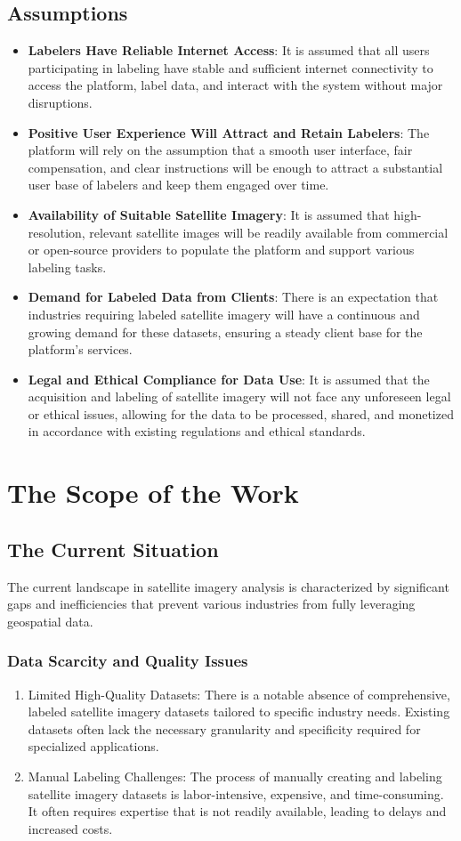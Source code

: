 \documentclass[12pt]{article}
\begin{document}
\subsection{Assumptions}
\begin{itemize}
    \item \textbf{Labelers Have Reliable Internet Access}: It is assumed that all users participating in labeling have stable and sufficient internet connectivity to access the platform, label data, and interact with the system without major disruptions.
    \item \textbf{Positive User Experience Will Attract and Retain Labelers}: The platform will rely on the assumption that a smooth user interface, fair compensation, and clear instructions will be enough to attract a substantial user base of labelers and keep them engaged over time.
    \item \textbf{Availability of Suitable Satellite Imagery}: It is assumed that high-resolution, relevant satellite images will be readily available from commercial or open-source providers to populate the platform and support various labeling tasks.
    \item \textbf{Demand for Labeled Data from Clients}: There is an expectation that industries requiring labeled satellite imagery will have a continuous and growing demand for these datasets, ensuring a steady client base for the platform’s services.
    \item \textbf{Legal and Ethical Compliance for Data Use}: It is assumed that the acquisition and labeling of satellite imagery will not face any unforeseen legal or ethical issues, allowing for the data to be processed, shared, and monetized in accordance with existing regulations and ethical standards.
\end{itemize}

\newpage
\section{The Scope of the Work}
\subsection{The Current Situation}
The current landscape in satellite imagery analysis is characterized by significant gaps and inefficiencies that prevent various industries from fully leveraging geospatial data.
\subsubsection{Data Scarcity and Quality Issues}
\begin{enumerate}
    \item Limited High-Quality Datasets: There is a notable absence of comprehensive, labeled satellite imagery datasets tailored to specific industry needs. Existing datasets often lack the necessary granularity and specificity required for specialized applications.
    \item Manual Labeling Challenges: The process of manually creating and labeling satellite imagery datasets is labor-intensive, expensive, and time-consuming. It often requires expertise that is not readily available, leading to delays and increased costs.
\end{enumerate}
\end{document}
